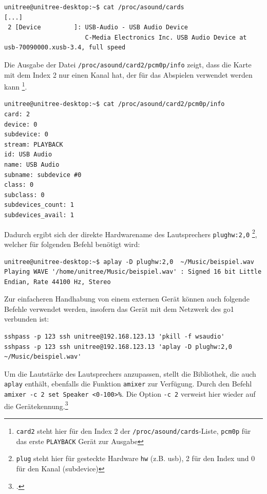 \begin{lstlisting}
unitree@unitree-desktop:~$ cat /proc/asound/cards
[...]
 2 [Device         ]: USB-Audio - USB Audio Device
                      C-Media Electronics Inc. USB Audio Device at usb-70090000.xusb-3.4, full speed
\end{lstlisting}

\noindent Die Ausgabe der Datei \texttt{/proc/\allowbreak asound/\allowbreak card2/\allowbreak pcm0p/\allowbreak info}
zeigt, dass die Karte mit dem Index \num{2} nur einen Kanal hat, der für das Abspielen verwendet werden kann
\footnote{\texttt{card2} steht hier für den Index \num{2} der \texttt{/proc/asound/cards}-Liste, \texttt{pcm0p} für das erste \texttt{PLAYBACK} Gerät zur Ausgabe}.

\begin{lstlisting}
unitree@unitree-desktop:~$ cat /proc/asound/card2/pcm0p/info
card: 2
device: 0
subdevice: 0
stream: PLAYBACK
id: USB Audio
name: USB Audio
subname: subdevice #0
class: 0
subclass: 0
subdevices_count: 1
subdevices_avail: 1
\end{lstlisting}

\noindent Dadurch ergibt sich der direkte Hardwarename des Lautsprechers \texttt{plughw:2,0}
\footnote{\texttt{plug} steht hier für gesteckte Hardware \texttt{hw} (z.B. \gls{usb}), \num{2} für den Index und \num{0} für den Kanal (subdevice)},
welcher für folgenden Befehl benötigt wird:

\begin{lstlisting}
unitree@unitree-desktop:~$ aplay -D plughw:2,0  ~/Music/beispiel.wav
Playing WAVE '/home/unitree/Music/beispiel.wav' : Signed 16 bit Little Endian, Rate 44100 Hz, Stereo
\end{lstlisting}

\noindent Zur einfacheren Handhabung von einem externen Gerät können auch folgende Befehle verwendet werden, insofern das Gerät mit dem Netzwerk
des \gls{go1} verbunden ist:

\begin{lstlisting}
sshpass -p 123 ssh unitree@192.168.123.13 'pkill -f wsaudio'
sshpass -p 123 ssh unitree@192.168.123.13 'aplay -D plughw:2,0 ~/Music/beispiel.wav'
\end{lstlisting}

\noindent Um die Lautstärke des Lautsprechers anzupassen, stellt die Bibliothek, die auch \texttt{aplay} enthält, ebenfalls die
Funktion \texttt{amixer} zur Verfügung.
Durch den Befehl \texttt{amixer -c 2 set Speaker <0-100>\%}.
Die Option \texttt{-c 2} verweist hier wieder auf die Gerätekennung.\footcite{alsa}
